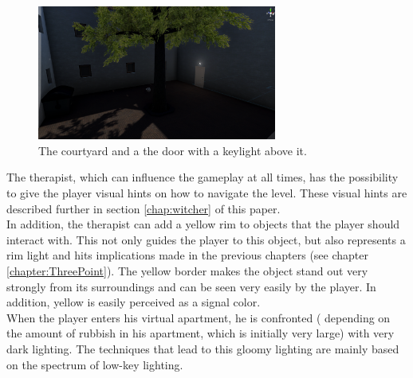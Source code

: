 \begin{figure}[H]
	\centering
		\includegraphics[width=0.7\textwidth]{Bilder/Innenhof keylight.PNG}
	\caption{The courtyard and a the door with a keylight above it. }
	\label{fig:door}
\end{figure}


The therapist, which can influence the gameplay at all times, has the possibility to give the player visual hints on how to navigate the level. These visual hints are described further in section \ref{chap:witcher} of this paper. \\
In addition, the therapist can add a yellow rim to objects that the player should interact with. This not only guides the player to this object, but also represents a rim light and hits implications made in the previous chapters (see chapter \ref{chapter:ThreePoint}). The yellow border makes the object stand out very strongly from its surroundings and can be seen very easily by the player. In addition, yellow is easily perceived as a signal color.\\
\newpage
When the player enters his virtual apartment, he is confronted ( depending on the amount of rubbish in his apartment, which is initially very large) with very dark lighting. The techniques that lead to this gloomy lighting are mainly based on the spectrum of low-key lighting.

